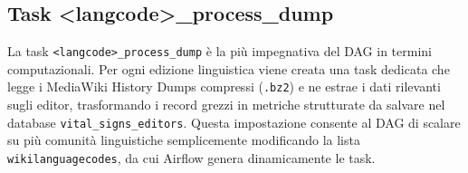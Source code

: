 \subsection{Task \textless langcode\textgreater\_process\_dump}
\label{subsec:process_dump}

La task \texttt{<langcode>\_process\_dump} è la più impegnativa del DAG in termini computazionali. 
Per ogni edizione linguistica viene creata una task dedicata che legge i MediaWiki History Dumps compressi (\texttt{.bz2}) e ne estrae i dati rilevanti sugli editor, trasformando i record grezzi in metriche strutturate da salvare nel database \texttt{vital\_signs\_editors}. 
Questa impostazione consente al DAG di scalare su più comunità linguistiche semplicemente modificando la lista \texttt{wikilanguagecodes}, da cui Airflow genera dinamicamente le task.

